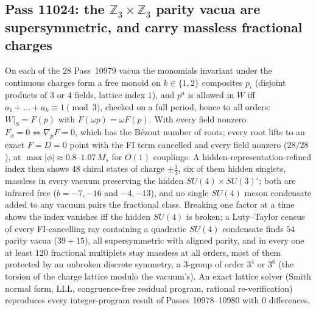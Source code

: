 \subsection{Pass 11024: the $\mathbb{Z}_3\times\mathbb{Z}_3$ parity vacua are supersymmetric, and carry massless fractional charges}

On each of the $28$ Pass~10979 vacua the monomials invariant under the continuous charges form a free monoid on $k\in\{1,2\}$
composites $p_i$ (disjoint products of $3$ or $4$ fields, lattice index $1$), and $p^a$ is allowed in $W$ iff
$a_1+\dots+a_k\equiv1\pmod3$, checked on a full period, hence to all orders: $W|_S=F(p)$ with $F(\omega p)=\omega F(p)$.
With every field nonzero $F_\phi=0\iff\nabla_pF=0$, which has the B\'ezout number of roots; every root lifts to an exact
$F=D=0$ point with the FI term cancelled and every field nonzero ($28/28$), at $\max|\phi|\approx0.8$--$1.07\,M_s$ for $O(1)$
couplings.  A hidden-representation-refined index then shows $48$ chiral states of charge $\pm\tfrac13$, six of them
hidden singlets, massless in every vacuum preserving the hidden $SU(4)\times SU(3)'$; both are infrared free
($b=-7,-16$ and $-4,-13$), and no single $SU(4)$ meson condensate added to any vacuum pairs the fractional class.
Breaking one factor at a time shows the index vanishes iff the hidden $SU(4)$ is broken; a Luty--Taylor census of every
FI-cancelling ray containing a quadratic $SU(4)$ condensate finds $54$ parity vacua ($39+15$), all supersymmetric with
aligned parity, and in every one at least $120$ fractional multiplets stay massless at all orders, most of them
protected by an unbroken discrete symmetry, a $3$-group of order $3^4$ or $3^6$ (the torsion of the charge lattice modulo the vacuum's).
An exact lattice solver (Smith normal form, LLL, congruence-free residual program, rational re-verification) reproduces
every integer-program result of Passes 10978--10980 with $0$ differences.

